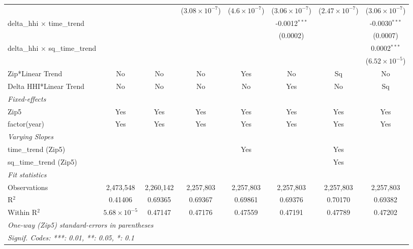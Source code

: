 \begin{table}[H]
{\begin{tabular}{lccccccc}
   &   &    & ($3.08\times 10^{-7}$) & ($4.6\times 10^{-7}$) & ($3.06\times 10^{-7}$) & ($2.47\times 10^{-7}$) & ($3.06\times 10^{-7}$)\\ 

 delta\_hhi $\times $ time\_trend&   &    &    &    & -0.0012$^{***}$ &    & -0.0030$^{***}$\\ 

   &   &    &    &    & (0.0002) &    & (0.0007)\\ 

 delta\_hhi $\times $ sq\_time\_trend&   &    &    &    &    &    & 0.0002$^{***}$\\ 

   &   &    &    &    &    &    & ($6.52\times 10^{-5}$)\\ 

 Zip*Linear Trend & No & No & No & Yes & No & Sq & No\\ 

 Delta HHI*Linear Trend & No & No & No & No & Yes & No & Sq\\ 

 \midrule \emph{Fixed-effects}&   &   &   &   &   &   &  \\ 

 Zip5 & Yes & Yes & Yes & Yes & Yes & Yes & Yes\\ 

 factor(year) & Yes & Yes & Yes & Yes & Yes & Yes & Yes\\ 

 \midrule \emph{Varying Slopes}&   &   &   &   &   &   &  \\ 

 time\_trend (Zip5) &  &  &  & Yes &  & Yes & \\ 

 sq\_time\_trend (Zip5) &  &  &  &  &  & Yes & \\ 

 \midrule \emph{Fit statistics}&  & & & & & & \\ 

 Observations & 2,473,548&2,260,142&2,257,803&2,257,803&2,257,803&2,257,803&2,257,803\\ 

 R$^2$ & 0.41406&0.69365&0.69367&0.69861&0.69376&0.70170&0.69382\\ 

 Within R$^2$ & $5.68\times 10^{-5}$&0.47147&0.47176&0.47559&0.47191&0.47789&0.47202\\ 

 \midrule\midrule\multicolumn{8}{l}{\emph{One-way (Zip5) standard-errors in parentheses}}\\ 

 \multicolumn{8}{l}{\emph{Signif. Codes: ***: 0.01, **: 0.05, *: 0.1}}\\ 

 \end{tabular}} 

 \end{table} 

